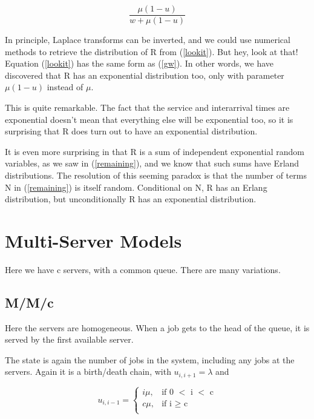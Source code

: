 \begin{equation}
\label{lookit}
\frac{\mu(1-u)}{w + \mu(1-u)}
\end{equation}

In principle, Laplace transforms can be inverted, and we could use
numerical methods to retrieve the distribution of R from (\ref{lookit}).
But hey, look at that!  Equation (\ref{lookit}) has the same form as
(\ref{gw}).  In other words, we have discovered that R has an   
exponential distribution too, only with parameter $\mu(1-u)$ instead
of $\mu$.  


This is quite remarkable.  The fact that the service and interarrival
times are exponential doesn't mean that everything else will be
exponential too, so it is surprising that R does turn out to have an
exponential distribution.  

It is even more surprising in that R is a sum of independent exponential
random variables, as we saw in (\ref{remaining}), and we know that such
sums have Erland distributions.  The resolution of this seeming paradox
is that the number of terms N in (\ref{remaining}) is itself random.  
Conditional on N, R has an Erlang distribution, but unconditionally R
has an exponential distribution.

\section{Multi-Server Models}

Here we have c servers, with a common queue.  There are many variations.

\subsection{M/M/c}

Here the servers are homogeneous.  When a job gets to the head of the
queue, it is served by the first available server.

The state is again the number of jobs in the system, including any jobs
at the servers.  Again it is a birth/death chain, with
$u_{i,i+1}=\lambda$ and

\begin{equation}
u_{i,i-1} = \begin{cases}
   i \mu, & \text{if 0 $<$ i $<$ c} \\
   c \mu, & \text{if  i $\geq$ c} \\
\end{cases}
\end{equation}

